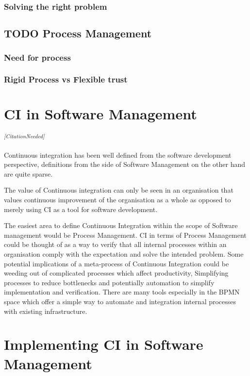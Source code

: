 \documentclass[12pt,conference]{IEEEtran}
\newcommand{\citationneeded}{\textsuperscript{\textit{[CitationNeeded]}}}
\begin{document}
\subsubsection*{Solving the right problem}

\subsection*{TODO Process Management}
\subsubsection*{Need for process}
\subsubsection*{Rigid Process vs Flexible trust} \cite{benner_exploitation_2003}

\section*{CI in Software Management}

\citationneeded

Continuous integration has been well defined from the software development perspective, definitions from the side of Software Management on the other hand are quite sparse. 

The value of Continuous integration can only be seen in an organisation that values continuous improvement of the organisation as a whole as opposed to merely using CI as a tool for software development.

The easiest area to define Continuous Integration within the scope of Software management would be Process Management. CI in terms of Process Management could be thought of as a way to verify that all internal processes within an organisation comply with the expectation and solve the intended problem. Some potential implications of a meta-process of Continuous Integration could be weeding out of complicated processes which affect productivity, Simplifying processes to reduce bottlenecks and potentially automation to simplify implementation and verification. There are many tools especially in the BPMN space which offer a simple way to automate and integration internal processes with existing infrastructure. 

\section*{Implementing CI in Software Management}
\end{document}

